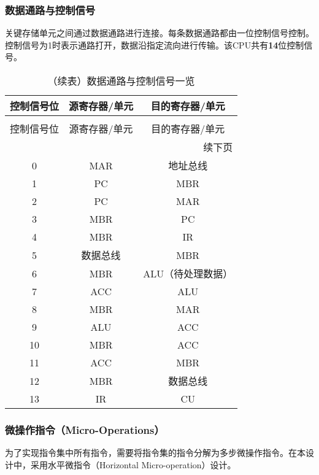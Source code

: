 \documentclass[lang=cn,a4paper,newtx]{elegantpaper}
\begin{document}
\subsubsection{数据通路与控制信号}\label{sec:datapath}
关键存储单元之间通过数据通路进行连接。每条数据通路都由一位控制信号控制。控制信号为1时表示通路打开，数据沿指定流向进行传输。该CPU共有\textbf{14}位控制信号。
\begin{longtable}{c c c}
  \caption{数据通路与控制信号一览} \label{tab:CPU:DataPath} \\
  \toprule
  控制信号位 & 源寄存器/单元  & 目的寄存器/单元  \\
  \midrule
  \endfirsthead

  \caption[]{（续表）数据通路与控制信号一览} \\
  \toprule
  控制信号位 & 源寄存器/单元  & 目的寄存器/单元  \\
  \midrule
  \endhead

  \midrule
  \multicolumn{3}{r}{续下页} \\
  \midrule
  \endfoot

  \bottomrule
  \endlastfoot

  0  & MAR   & 地址总线  \\
  1  & PC    & MBR  \\
  2  & PC    & MAR  \\
  3  & MBR   & PC  \\
  4  & MBR   & IR  \\
  5  & 数据总线 & MBR  \\
  6  & MBR   & ALU（待处理数据） \\
  7  & ACC   & ALU  \\
  8  & MBR   & MAR  \\
  9  & ALU   & ACC  \\
  10 & MBR   & ACC  \\
  11 & ACC   & MBR  \\
  12 & MBR   & 数据总线  \\
  13 & IR    & CU  \\
\end{longtable}

\subsubsection{微操作指令（Micro-Operations）}
为了实现指令集中所有指令，需要将指令集的指令分解为多步微操作指令。在本设计中，采用水平微指令（Horizontal Micro-operation）设计。
\end{document}
